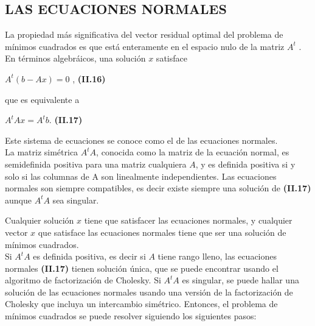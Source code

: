 \documentclass[twocolumn,twoside]{article}
\begin{document}
\subsection{LAS ECUACIONES NORMALES}
La propiedad m\'as significativa del vector residual optimal del problema de m\'inimos
cuadrados es que est\'a enteramente en el espacio nulo de la matriz $A^t$ . En t\'erminos
algebr\'aicos, una soluci\'on $x$ satisface
\begin{center}
 $A^t (b - A x) = 0$ ,\hspace{2cm} \textbf{(II.16)}
\end{center}
que es equivalente a
\begin{center}
 $ A^t A x = A^t b $. \hspace{2cm} \textbf{(II.17)}
\end{center}

Este sistema de ecuaciones se conoce como el de las ecuaciones normales.\\

La matriz sim\'etrica $A^t A$, conocida como la matriz de la ecuaci\'on normal, es
semidefinida positiva para una matriz cualquiera $A$, y es definida positiva si y solo si
las columnas de A son linealmente independientes. Las ecuaciones normales son siempre
compatibles, es decir existe siempre una soluci\'on de \textbf{(II.17)} aunque $A^t A$ sea singular.

Cualquier soluci\'on $x$ tiene que satisfacer las ecuaciones normales, y cualquier vector $x$
que satisface las ecuaciones normales tiene que ser una soluci\'on de m\'inimos cuadrados.\\
Si $A^t A$ es definida
positiva, es decir si $A$ tiene rango lleno, las ecuaciones normales \textbf{(II.17)} tienen soluci\'on
\'unica, que se puede encontrar usando el algoritmo de factorizaci\'on de Cholesky. Si $A^t A$
es singular, se puede hallar una soluci\'on de las ecuaciones normales usando una versi\'on de
la factorizaci\'on de Cholesky que incluya un intercambio sim\'etrico. Entonces, el problema
de m\'inimos cuadrados se puede resolver siguiendo los siguientes pasos:
\end{document}
